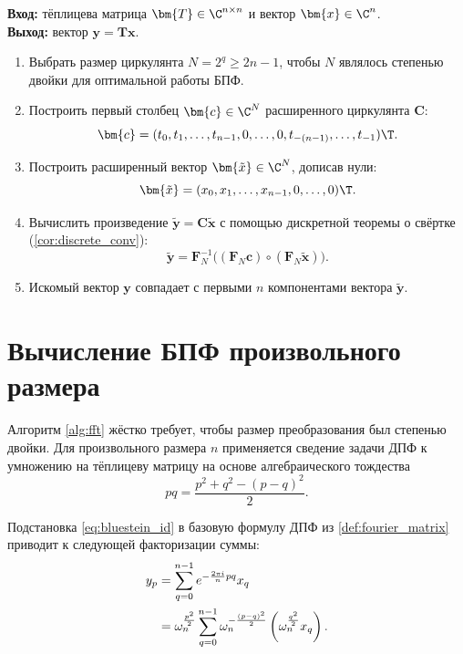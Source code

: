 \begin{tcbalgorithmbox}
\label{alg:toeplitz_mult}
    \textbf{Вход:} тёплицева матрица $\bm{T} \in \C^{n \times n}$ и вектор $\bm{x} \in \C^n$.\\
    \textbf{Выход:} вектор $\bm{y} = \bm{T}\bm{x}$.
    \begin{enumerate}
        \item Выбрать размер циркулянта $N = 2^q \geq 2n-1$, чтобы $N$ являлось степенью двойки для оптимальной работы БПФ.
        \item Построить первый столбец $\bm{c} \in \C^N$ расширенного циркулянта $\bm{C}$:
        \[
            \bm{c} = (t_0, t_1, \dots, t_{n-1}, 0, \dots, 0, t_{-(n-1)}, \dots, t_{-1})\T.
        \]
        \item Построить расширенный вектор $\bm{\tilde{x}} \in \C^N$, дописав нули:
        \[
            \bm{\tilde{x}} = (x_0, x_1, \dots, x_{n-1}, 0, \dots, 0)\T.
        \]
        \item Вычислить произведение $\bm{\tilde{y}} = \bm{C}\bm{\tilde{x}}$ с помощью дискретной теоремы о свёртке (\cref{cor:discrete_conv}):
        \[
            \bm{\tilde{y}} = \bm{F}_N^{-1} \bigl( (\bm{F}_N \bm{c}) \circ (\bm{F}_N \bm{\tilde{x}}) \bigr).
        \]
        \item Искомый вектор $\bm{y}$ совпадает с первыми $n$ компонентами вектора $\bm{\tilde{y}}$.
    \end{enumerate}
\end{tcbalgorithmbox}

\section{Вычисление БПФ произвольного размера}
\label{sec:bluestein}

Алгоритм \cref{alg:fft} жёстко требует, чтобы размер преобразования был степенью двойки. Для произвольного размера $n$ применяется сведение задачи ДПФ к умножению на тёплицеву матрицу на основе алгебраического тождества
\begin{equation}
    pq = \frac{p^2 + q^2 - (p-q)^2}{2}.
    \label{eq:bluestein_id}
\end{equation}

Подстановка \cref{eq:bluestein_id} в базовую формулу ДПФ из \cref{def:fourier_matrix} приводит к следующей факторизации суммы:
\begin{align}
    y_p &= \sum_{q=0}^{n-1} e^{-\frac{2\pi i}{n} pq} x_q \notag \\
    &= \omega_n^{\frac{p^2}{2}} \sum_{q=0}^{n-1} \omega_n^{-\frac{(p-q)^2}{2}} \left( \omega_n^{\frac{q^2}{2}} x_q \right).
    \label{eq:bluestein_sum}
\end{align}

